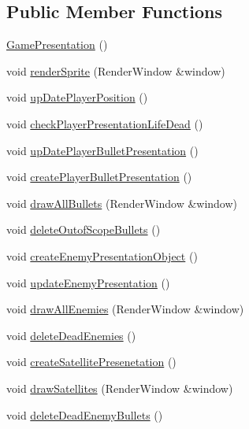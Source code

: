 \subsection*{Public Member Functions}
\begin{DoxyCompactItemize}
\item 
\hyperlink{class_game_presentation_a14dbabbd4d03bd81522a95f235eefc4b}{Game\+Presentation} ()
\item 
void \hyperlink{class_game_presentation_ae2a317ddda3f666fdb1ca4f4c68f6b49}{render\+Sprite} (Render\+Window \&window)
\item 
void \hyperlink{class_game_presentation_a08abc97c6f65eda4ac7c54d55a9054b4}{up\+Date\+Player\+Position} ()
\item 
void \hyperlink{class_game_presentation_a027b38ee9bf11018b4db7494d2e145a0}{check\+Player\+Presentation\+Life\+Dead} ()
\item 
void \hyperlink{class_game_presentation_af0a19d50c4099e7a19426cdffa5ebb82}{up\+Date\+Player\+Bullet\+Presentation} ()
\item 
void \hyperlink{class_game_presentation_ac87927887e1afc5583036efb01ab35ca}{create\+Player\+Bullet\+Presentation} ()
\item 
void \hyperlink{class_game_presentation_a874688a19d648902d43751a198e2d9ab}{draw\+All\+Bullets} (Render\+Window \&window)
\item 
void \hyperlink{class_game_presentation_a313bd414a0cc712fccd919df4b794b8a}{delete\+Outof\+Scope\+Bullets} ()
\item 
void \hyperlink{class_game_presentation_a59645176840f6ddec2673b9d447334d5}{create\+Enemy\+Presentation\+Object} ()
\item 
void \hyperlink{class_game_presentation_a4ab96a6022c08f34aefa62f9a30c1cd8}{update\+Enemy\+Presentation} ()
\item 
void \hyperlink{class_game_presentation_af29e04c4a89f0a6d1ca9eab33da5ace5}{draw\+All\+Enemies} (Render\+Window \&window)
\item 
void \hyperlink{class_game_presentation_ae83bb9e0751f6077f2480a36dec36787}{delete\+Dead\+Enemies} ()
\item 
void \hyperlink{class_game_presentation_a921823ce61d5c9a0db91098c8f055d28}{create\+Satellite\+Presenetation} ()
\item 
void \hyperlink{class_game_presentation_a7a94467d53b62bd7a83035ea4fa386ac}{draw\+Satellites} (Render\+Window \&window)
\item 
void \hyperlink{class_game_presentation_acc8d59152c26b9dddc84081c5a4483f2}{delete\+Dead\+Enemy\+Bullets} ()

\end{DoxyCompactItemize}
